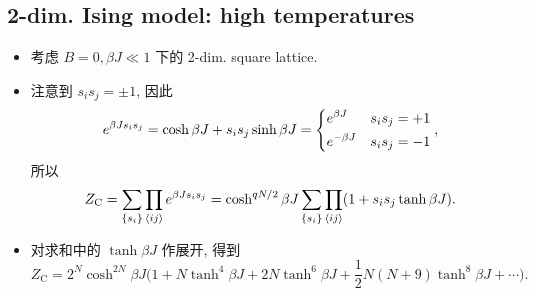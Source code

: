 \subsection{2-dim. Ising model: high temperatures}
\begin{itemize}
	\item 考虑 $B = 0, \beta J \ll 1$ 下的 2-dim. square lattice.
	
	\item 注意到 $s_i s_j = \pm 1$, 因此
	\begin{equation}
		e^{\beta J s_i s_j} = \cosh \beta J + s_i s_j \sinh \beta J = \begin{dcases}
			e^{\beta J} & s_i s_j = + 1 \\
			e^{- \beta J} & s_i s_j = - 1
		\end{dcases},
	\end{equation}
	所以
	\begin{equation}
		Z_\text{C} = \sum_{\{s_i\}} \prod_{\braket{i j}} e^{\beta J s_i s_j} = \cosh^{q N / 2} \beta J \sum_{\{s_i\}} \prod_{\braket{i j}} (1 + s_i s_j \tanh \beta J).
	\end{equation}
	
	\item 对求和中的 $\tanh \beta J$ 作展开, 得到
	\begin{equation} \label{11.4.23}
		Z_\text{C} = 2^N \cosh^{2 N} \beta J \Big( 1 + N \tanh^4 \beta J + 2 N \tanh^6 \beta J + \frac{1}{2} N (N + 9) \tanh^8 \beta J + \cdots \Big).
	\end{equation}
	

\end{itemize}
